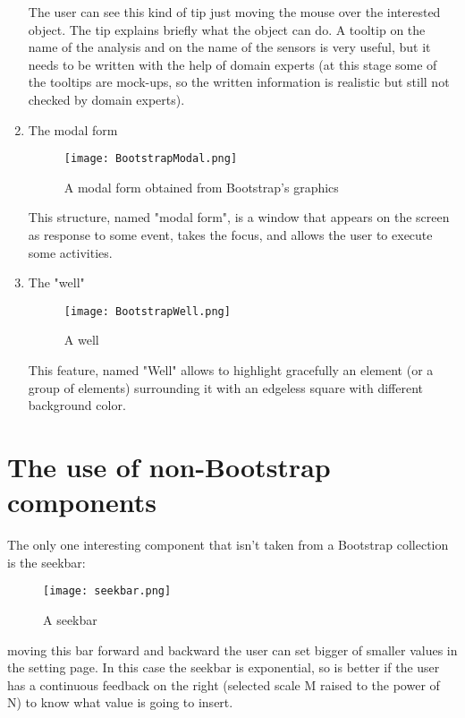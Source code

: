 \begin{enumerate}
The user can see this kind of tip just moving the mouse over the interested object. The tip explains briefly what the object can do. A tooltip on the name of the analysis and on the name of the sensors is very useful, but it needs to be written with the help of domain experts (at this stage some of the tooltips are mock-ups, so the written information is realistic but still not checked by domain experts). 

\item The modal form

\begin{figure}[H]
\centering
\texttt{[image: BootstrapModal.png]} 
\caption{A modal form obtained from Bootstrap's graphics}
\end{figure}

This structure, named "modal form", is a window that appears on the screen as response to some event, takes the focus, and allows the user to execute some activities. 

\item The "well"

\begin{figure}[H]
\centering
\texttt{[image: BootstrapWell.png]} 
\caption{A well}
\end{figure}

This feature, named "Well" allows to highlight gracefully an element (or a group of elements) surrounding it with an edgeless square with different background color. 

\end{enumerate}

\section{The use of non-Bootstrap components}

The only one interesting component that isn't taken from a Bootstrap collection is the seekbar: 

\begin{figure}[H]
\centering
\texttt{[image: seekbar.png]} 
\caption{A seekbar}
\end{figure}

moving this bar forward and backward the user can set bigger of smaller values in the setting page. In this case the seekbar is exponential, so is better if the user has a continuous feedback on the right (selected scale M raised to the power of N) to know what value is going to insert.